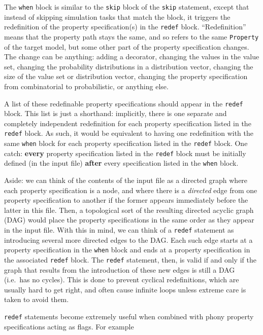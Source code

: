 \documentclass{article}
\begin{document}
The {\tt when} block is similar to the {\tt skip} block of the {\tt skip} statement, except that instead of skipping simulation tasks that match the block, it triggers the redefinition of the property specification(s) in the {\tt redef} block. ``Redefinition'' means that the property path stays the same, and so refers to the same {\tt Property} of the target model, but some other part of the property specification changes. The change can be anything: adding a decorator, changing the values in the value set, changing the probability distributions in a distribution vector, changing the size of the value set or distribution vector, changing the property specification from combinatorial to probabilistic, or anything else.

A list of these redefinable property specifications should appear in the {\tt redef} block. This list is just a shorthand: implicitly, there is one separate and completely independent redefinition for each property specification listed in the {\tt redef} block. As such, it would be equivalent to having one redefinition with the same {\tt when} block for each property specification listed in the {\tt redef} block. One catch: \textbf{every} property specification listed in the {\tt redef} block must be initially defined (in the input file) \textbf{after} every specification listed in the {\tt when} block.

\begin{sideblock}
Aside: we can think of the contents of the input file as a directed graph where each property specification is a node, and where there is a \textit{directed} edge from one property specification to another if the former appears immediately before the latter in this file. Then, a topological sort of the resulting directed acyclic graph (DAG) would place the property specifications in the same order as they appear in the input file. With this in mind, we can think of a {\tt redef} statement as introducing several more directed edges to the DAG. Each such edge starts at a property specification in the {\tt when} block and ends at a property specification in the associated {\tt redef} block. The {\tt redef} statement, then, is valid if and only if the graph that results from the introduction of these new edges is still a DAG (i.e.\ has no cycles). This is done to prevent cyclical redefinitions, which are usually hard to get right, and often cause infinite loops unless extreme care is taken to avoid them.
\end{sideblock}

{\tt redef} statements become extremely useful when combined with phony property specifications acting as flags. For example
\end{document}
